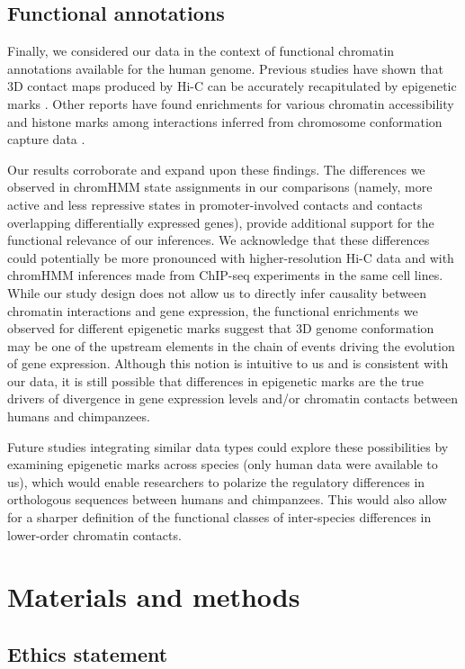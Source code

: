 \subsection{Functional annotations}

Finally, we considered our data in the context of functional chromatin annotations available for the human genome. Previous studies have shown that 3D contact maps produced by Hi-C can be accurately recapitulated by epigenetic marks \cite{Pierro.2017, Zhu.2016}. Other reports have found enrichments for various chromatin accessibility and histone marks among interactions inferred from chromosome conformation capture data \cite{Roy.2015, Ron.2017}.

Our results corroborate and expand upon these findings. The differences we observed in chromHMM state assignments in our comparisons (namely, more active and less repressive states in promoter-involved contacts and contacts overlapping differentially expressed genes), provide additional support for the functional relevance of our inferences. We acknowledge that these differences could potentially be more pronounced with higher-resolution Hi-C data and with chromHMM inferences made from ChIP-seq experiments in the same cell lines. While our study design does not allow us to directly infer causality between chromatin interactions and gene expression, the functional enrichments we observed for different epigenetic marks suggest that 3D genome conformation may be one of the upstream elements in the chain of events driving the evolution of gene expression. Although this notion is intuitive to us and is consistent with our data, it is still possible that differences in epigenetic marks are the true drivers of divergence in gene expression levels and/or chromatin contacts between humans and chimpanzees.

Future studies integrating similar data types could explore these possibilities by examining epigenetic marks across species (only human data were available to us), which would enable researchers to polarize the regulatory differences in orthologous sequences between humans and chimpanzees. This would also allow for a sharper definition of the functional classes of inter-species differences in lower-order chromatin contacts.

\section{Materials and methods}

\subsection{Ethics statement}

